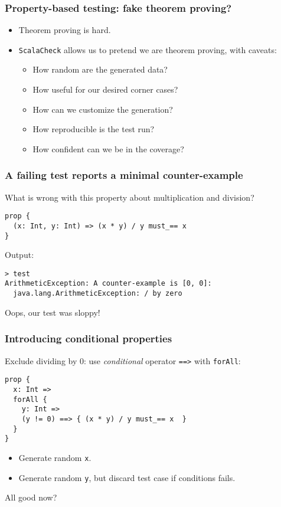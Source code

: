 \begin{frame}
  \frametitle{Property-based testing: fake theorem proving?}

  \begin{itemize}
    \item<1-> Theorem proving is hard.
    \item<2-> \texttt{ScalaCheck} allows us to pretend we are theorem proving, with caveats:
      \begin{itemize}
        \item<3-> How random are the generated data?
        \item<4-> How useful for our desired corner cases?
        \item<5-> How can we customize the generation?
        \item<6-> How reproducible is the test run?
        \item<7-> How confident can we be in the coverage?
      \end{itemize}
  \end{itemize}


\end{frame}

\begin{frame}[fragile]
  \frametitle{A failing test reports a minimal counter-example}

  What is wrong with this property about multiplication and division?

  \begin{verbatim}
prop {
  (x: Int, y: Int) => (x * y) / y must_== x
}
  \end{verbatim}

  Output:

  \begin{verbatim}
> test
ArithmeticException: A counter-example is [0, 0]:
  java.lang.ArithmeticException: / by zero
  \end{verbatim}

  Oops, our test was sloppy!
\end{frame}

\begin{frame}[fragile]
  \frametitle{Introducing conditional properties}

  Exclude dividing by 0: use \emph{conditional} operator \texttt{==>} with \texttt{forAll}:

  \begin{verbatim}
prop {
  x: Int =>
  forAll {
    y: Int =>
    (y != 0) ==> { (x * y) / y must_== x  }
  }
}
  \end{verbatim}

  \begin{itemize}
    \item Generate random \texttt{x}.
    \item Generate random \texttt{y}, but discard test case if conditions fails.
  \end{itemize}

  All good now?
\end{frame}

